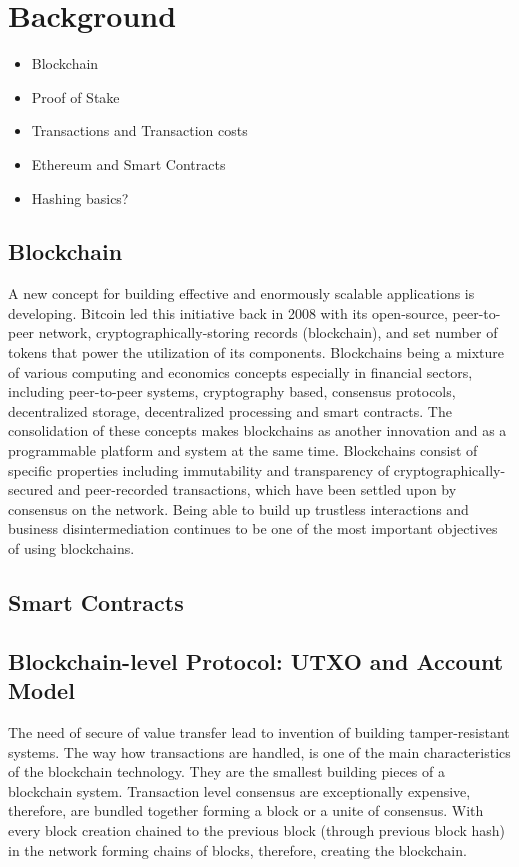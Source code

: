\section{Background}

\begin{itemize}
\item Blockchain
\item Proof of Stake
\item Transactions and Transaction costs
\item Ethereum and Smart Contracts
\item Hashing basics?
\end{itemize}

\subsection{Blockchain}

A new concept for building effective and enormously scalable applications is developing. Bitcoin led this initiative back in 2008 with its open-source, peer-to-peer network, cryptographically-storing records (blockchain), and set number of tokens that power the utilization of its components. Blockchains being a mixture of various computing and economics concepts especially in financial sectors, including peer-to-peer systems, cryptography based, consensus protocols, decentralized storage, decentralized processing and smart contracts. The consolidation of these concepts makes blockchains as another innovation and as a programmable platform and system at the same time. Blockchains consist of specific properties including immutability and transparency of cryptographically-secured and peer-recorded transactions, which have been settled upon by consensus on the network. Being able to build up trustless interactions and business disintermediation continues to be one of the most important objectives of using blockchains.

\subsection{Smart Contracts}



\subsection{Blockchain-level Protocol: UTXO and Account Model}

The need of secure of value transfer lead to invention of building tamper-resistant systems. The way how transactions are handled, is one of the main characteristics of the blockchain technology. They are the smallest building pieces of a blockchain system. Transaction level consensus are exceptionally expensive, therefore, are bundled together forming a block or a unite of consensus. With every block creation chained to the previous block (through previous block hash) in the network forming chains of blocks, therefore, creating the blockchain.


